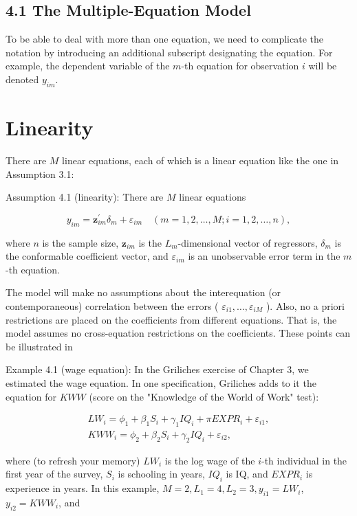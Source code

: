 \documentclass[10pt]{article}
\begin{document}
\subsection*{4.1 The Multiple-Equation Model}
To be able to deal with more than one equation, we need to complicate the notation by introducing an additional subscript designating the equation. For example, the dependent variable of the $m$-th equation for observation $i$ will be denoted $y_{i m}$.

\section*{Linearity}
There are $M$ linear equations, each of which is a linear equation like the one in Assumption 3.1:

Assumption 4.1 (linearity): There are $M$ linear equations


\begin{equation*}
y_{i m}=\mathbf{z}_{i m}^{\prime} \delta_{m}+\varepsilon_{i m} \quad(m=1,2, \ldots, M ; i=1,2, \ldots, n), \tag{4.1.1}
\end{equation*}


where $n$ is the sample size, $\mathbf{z}_{i m}$ is the $L_{m}$-dimensional vector of regressors, $\delta_{m}$ is the conformable coefficient vector, and $\varepsilon_{i m}$ is an unobservable error term in the $m$-th equation.

The model will make no assumptions about the interequation (or contemporaneous) correlation between the errors ( $\varepsilon_{i 1}, \ldots, \varepsilon_{i M}$ ). Also, no a priori restrictions are placed on the coefficients from different equations. That is, the model assumes no cross-equation restrictions on the coefficients. These points can be illustrated in

Example 4.1 (wage equation): In the Griliches exercise of Chapter 3, we estimated the wage equation. In one specification, Griliches adds to it the equation for $K W W$ (score on the "Knowledge of the World of Work" test):

$$
\begin{gathered}
L W_{i}=\phi_{1}+\beta_{1} S_{i}+\gamma_{1} I Q_{i}+\pi E X P R_{i}+\varepsilon_{i 1}, \\
K W W_{i}=\phi_{2}+\beta_{2} S_{i}+\gamma_{2} I Q_{i}+\varepsilon_{i 2},
\end{gathered}
$$

where (to refresh your memory) $L W_{i}$ is the log wage of the $i$-th individual in the first year of the survey, $S_{i}$ is schooling in years, $I Q_{i}$ is IQ, and $E X P R_{i}$ is experience in years. In this example, $M=2, L_{1}=4, L_{2}=3, y_{i 1}=L W_{i}$, $y_{i 2}=K W W_{i}$, and
\end{document}
